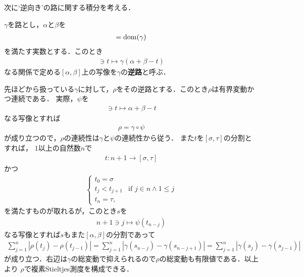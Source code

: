 	次に`逆向き'の路に関する積分を考える．
	
	\begin{screen}
		\begin{dfn}[逆路]
			$\gamma$を路とし，$\alpha$と$\beta$を
			\begin{align}
				[\alpha,\beta] = \dom{\gamma}
			\end{align}
			を満たす実数とする．このとき
			\begin{align}
				[\alpha, \beta] \ni t \longmapsto \gamma(\alpha + \beta - t) 
			\end{align}
			なる関係で定める$[\alpha,\beta]$上の写像を$\gamma$の{\bf 逆路}と呼ぶ．
		\end{dfn}
	\end{screen}
	
	先ほどから扱っている$\gamma$に対して，$\rho$をその逆路とする．このとき$\rho$は有界変動かつ連続である．
	実際，$\psi$を
	\begin{align}
		[\alpha,\beta] \ni t \longmapsto \alpha + \beta - t
	\end{align}
	なる写像とすれば
	\begin{align}
		\rho = \gamma \circ \psi
	\end{align}
	が成り立つので，$\rho$の連続性は$\gamma$と$\psi$の連続性から従う．
	また$t$を$[\sigma,\tau]$の分割とすれば，
	$1$以上の自然数$n$で
	\begin{align}
		t: n+1 \longrightarrow [\sigma,\tau]
	\end{align}
	かつ
	\begin{align}
		\begin{cases}
			t_{0} = \sigma & \\
			t_{j} < t_{j+1} & \mbox{if } j \in n \wedge 1 \leq j \\
			t_{n} = \tau, &
		\end{cases}
	\end{align}
	を満たすものが取れるが，このとき$s$を
	\begin{align}
		n+1 \ni j \longmapsto \psi(t_{n-j})
	\end{align}
	なる写像とすれば$s$もまた$[\alpha,\beta]$の分割であって
	\begin{align}
		\sum_{j=1}^{n} \left|\rho(t_{j}) - \rho(t_{j-1})\right|
		= \sum_{j=1}^{n} \left|\gamma(s_{n-j}) - \gamma(s_{n-j+1})\right|
		= \sum_{j=1}^{n} \left|\gamma(s_{j}) - \gamma(s_{j-1})\right|
	\end{align}
	が成り立つ．右辺は$\gamma$の総変動で抑えられるので$\rho$の総変動も有限値である．以上より
	$\rho$で複素Stieltjes測度を構成できる．
	

